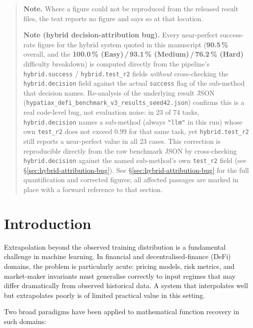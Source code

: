 \documentclass[twoside,11pt]{article}
\begin{document}
\begin{quote}\small
\textbf{Note.} Where a figure could not be reproduced from the released result
files, the text reports no figure and says so at that location.

\medskip
\noindent\textbf{Note (hybrid decision-attribution bug).} Every
near-perfect success-rate figure for the hybrid system quoted in this
manuscript (\textbf{90.5\,\%} overall, and the \textbf{100.0\,\%
(Easy)\,/\,93.1\,\% (Medium)\,/\,76.2\,\% (Hard)} difficulty
breakdown) is computed directly from the pipeline's \texttt{hybrid.success}
/ \texttt{hybrid.test\_r2} fields \emph{without} cross-checking the
\texttt{hybrid.decision} field against the actual \texttt{success} flag of
the sub-method that decision names. Re-analysis of the underlying result
JSON (\texttt{hypatiax\_defi\_benchmark\_v3\_results\_seed42.json}) confirms
this is a real code-level bug, not evaluation noise: in 23 of 74 tasks,
\texttt{hybrid.decision} names a sub-method (always \texttt{"llm"} in this
run) whose own \texttt{test\_r2} does not exceed 0.99 for that same task,
yet \texttt{hybrid.test\_r2} still reports a near-perfect value in all 23
cases. This correction is reproducible directly from the raw benchmark JSON
by cross-checking \texttt{hybrid.decision} against the named sub-method's
own \texttt{test\_r2} field (see \S\ref{sec:hybrid-attribution-bug}).
See \S\ref{sec:hybrid-attribution-bug} for the full quantification
and corrected figures; all affected passages are marked in place with a
forward reference to that section.
\end{quote}


\tableofcontents
\newpage

\section{Introduction}
\label{sec:intro}

Extrapolation beyond the observed training distribution is a fundamental challenge
in machine learning.  In financial and decentralised-finance (DeFi) domains, the
problem is particularly acute: pricing models, risk metrics, and market-maker
invariants must generalise correctly to input regimes that may differ dramatically
from observed historical data.  A system that interpolates well but extrapolates
poorly is of limited practical value in this setting.

Two broad paradigms have been applied to mathematical function recovery in such
domains:
\end{document}
